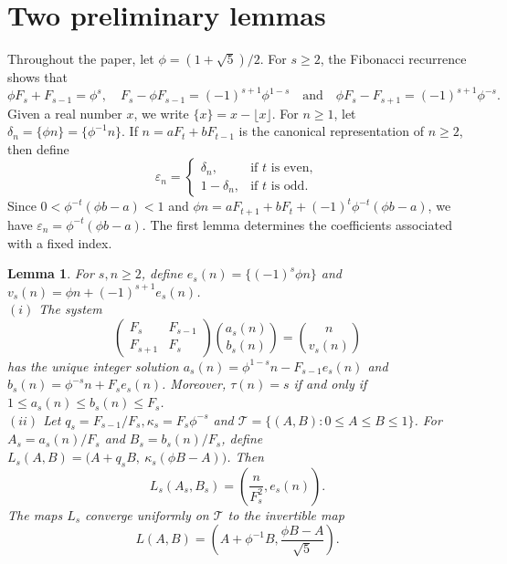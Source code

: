 \documentclass[11pt]{amsart}
\newtheorem{lemma}[theorem]{Lemma}
\theoremstyle{definition}
\newcommand{\eps}{\varepsilon}
\newcommand{\Tcal}{\mathcal T}
\begin{document}
\section{Two preliminary lemmas}
Throughout the paper, let $\phi=(1+\sqrt5)/2$. For $s\geq2$, the Fibonacci recurrence shows that 
\begin{equation}\label{eq:fib-phi-identities}
\phi F_s+F_{s-1}=\phi^s,\quad
F_s-\phi F_{s-1}=(-1)^{s+1}\phi^{1-s}
\quad\text{and}\quad
\phi F_s-F_{s+1}=(-1)^{s+1}\phi^{-s}.
\end{equation}
Given a real number $x$, we write $\{x\}=x-\lfloor x\rfloor$. For $n\geq1$, let $\delta_n=\{\phi n\}=\{\phi^{-1}n\}$. If $n=aF_t+bF_{t-1}$ is the canonical representation of $n\geq2$, then define
\[
\eps_n=
\begin{cases}
\delta_n,&\text{if $t$ is even},\\
1-\delta_n,&\text{if $t$ is odd}.
\end{cases}
\]
Since $0<\phi^{-t}(\phi b-a)<1$ and $\phi n=aF_{t+1}+bF_t+(-1)^t\phi^{-t}(\phi b-a)$, we have $\eps_n=\phi^{-t}(\phi b-a)$. The first lemma determines the coefficients
associated with a fixed index.
\begin{lemma}\label{lem:candidate}
For $s,n\geq2$, define $e_s(n)=\{(-1)^s\phi n\}$ and $v_s(n)=\phi n+(-1)^{s+1}e_s(n)$.\\
$(i)$ The system 
\[
\begin{pmatrix}
F_s&F_{s-1}\\
F_{s+1}&F_s
\end{pmatrix}
\binom{a_s(n)}{b_s(n)}
=
\binom{n}{v_s(n)}
\]
has the unique integer solution $a_s(n)=\phi^{1-s}n-F_{s-1}e_s(n)$ and $b_s(n)=\phi^{-s}n+F_se_s(n)$. Moreover, $\tau(n)=s$ if and only if $1\leq a_s(n)\leq b_s(n)\leq F_s$.\\
$(ii)$ Let $q_s=F_{s-1}/F_s, \kappa_s=F_s\phi^{-s}$ and $\Tcal=\{(A,B):0\leq A\leq B\leq1\}$. For $A_s=a_s(n)/F_s$ and $B_s=b_s(n)/F_s$, define $L_s(A,B)=\bigl(A+q_sB,\ \kappa_s(\phi B-A)\bigr)$.
Then
\[
L_s(A_s,B_s)=\left(\frac{n}{F_s^2},e_s(n)\right).
\]
The maps $L_s$ converge uniformly on $\Tcal$ to the invertible map
\[
L(A,B)=\left(A+\phi^{-1}B,\frac{\phi B-A}{\sqrt5}\right).
\]
\end{lemma}
\end{document}
